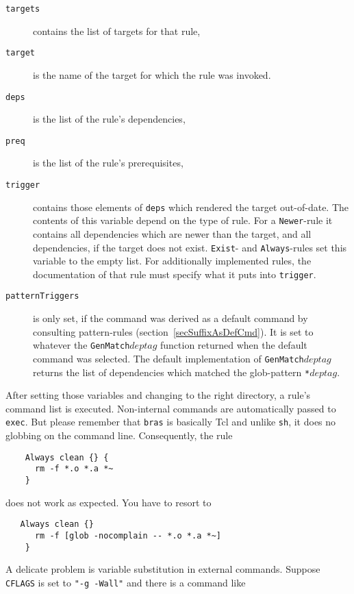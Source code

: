 \documentclass[12pt]{article}
\newcommand{\bras}{\texttt{bras}}
\begin{document}
\begin{description}
\item[\texttt{targets}] 
contains the list of targets for that rule,

\item[\texttt{target}] 
is the name of the target for which the rule
was invoked.

\item[\texttt{deps}] 
is the list of the rule's dependencies,

\item[\texttt{preq}] 
is the list of the rule's prerequisites,

\item[\texttt{trigger}]
contains those elements of \texttt{deps} which rendered the target
out-of-date. The contents of this variable depend on the type of
rule. For a \texttt{Newer}-rule it contains all dependencies which are
newer than the target, and all dependencies, if the target does not
exist. \texttt{Exist}- and \texttt{Always}-rules set this variable to
the empty list. For additionally implemented rules, the documentation
of that rule must specify what it puts into \texttt{trigger}.

\item[\texttt{patternTriggers}] is only set, if the command was
derived as a default command by consulting pattern-rules
(section~\ref{secSuffixAsDefCmd}). It is set to whatever the
\texttt{GenMatch$deptag$} function returned when the default command
was selected. The default implementation of \texttt{GenMatch$deptag$}
returns the list of dependencies which matched the glob-pattern
\texttt{*$deptag$}.
\end{description}

After setting those variables and changing to the right directory, a
rule's command list is executed. Non-internal commands are
automatically passed to \texttt{exec}. But please remember that
\bras{} is basically Tcl and unlike \texttt{sh}, it does no globbing
on the command line. Consequently, the rule
\begin{verbatim}
    Always clean {} {
      rm -f *.o *.a *~
    }
\end{verbatim}
does not work as expected. You have to resort to
\begin{verbatim}
   Always clean {}
      rm -f [glob -nocomplain -- *.o *.a *~]
    }
\end{verbatim}
    
A delicate problem is variable substitution in
external commands. Suppose \texttt{CFLAGS} is set to 
\texttt{"-g -Wall"} and there is a command like 
\end{document}
